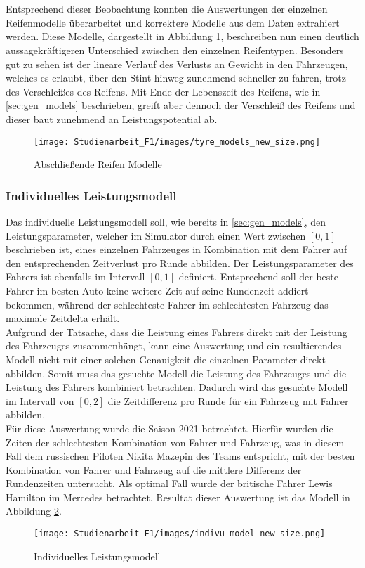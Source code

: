 \\\\
Entsprechend dieser Beobachtung konnten die Auswertungen der einzelnen Reifenmodelle überarbeitet und korrektere Modelle aus dem Daten extrahiert werden. Diese Modelle, dargestellt in Abbildung \ref{fig:tyre_models_new}, beschreiben nun einen deutlich aussagekräftigeren Unterschied zwischen den einzelnen Reifentypen. Besonders gut zu sehen ist der lineare Verlauf des Verlusts an Gewicht in den Fahrzeugen, welches es erlaubt, über den Stint hinweg zunehmend schneller zu fahren, trotz des Verschleißes des Reifens. Mit Ende der Lebenszeit des Reifens, wie in \ref{sec:gen_models} beschrieben, greift aber dennoch der Verschleiß des Reifens und dieser baut zunehmend an Leistungspotential ab.\\
\begin{figure}
    \texttt{[image: Studienarbeit\_F1/images/tyre\_models\_new\_size.png]}
    \caption{Abschließende Reifen Modelle}
    \label{fig:tyre_models_new}
\end{figure}

\subsubsection{Individuelles Leistungsmodell}
Das individuelle Leistungsmodell soll, wie bereits in \ref{sec:gen_models}, den Leistungsparameter, welcher im Simulator durch einen Wert zwischen $[0,1]$ beschrieben ist, eines einzelnen Fahrzeuges in Kombination mit dem Fahrer auf den entsprechenden Zeitverlust pro Runde abbilden. Der Leistungsparameter des Fahrers ist ebenfalls im Intervall $[0,1]$ definiert. Entsprechend soll der beste Fahrer im besten Auto keine weitere Zeit auf seine Rundenzeit addiert bekommen, während der schlechteste Fahrer im schlechtesten Fahrzeug das maximale Zeitdelta erhält.\\
Aufgrund der Tatsache, dass die Leistung eines Fahrers direkt mit der Leistung des Fahrzeuges zusammenhängt, kann eine Auswertung und ein resultierendes Modell nicht mit einer solchen Genauigkeit die einzelnen Parameter direkt abbilden. Somit muss das gesuchte Modell die Leistung des Fahrzeuges und die Leistung des Fahrers kombiniert betrachten. Dadurch wird das gesuchte Modell im Intervall von $[0,2]$ die Zeitdifferenz pro Runde für ein Fahrzeug mit Fahrer abbilden.\\
Für diese Auswertung wurde die Saison 2021 betrachtet. Hierfür wurden die Zeiten der schlechtesten Kombination von Fahrer und Fahrzeug, was in diesem Fall dem russischen Piloten Nikita Mazepin des Teams  entspricht, mit der besten Kombination von Fahrer und Fahrzeug auf die mittlere Differenz der Rundenzeiten untersucht. Als optimal Fall wurde der britische Fahrer Lewis Hamilton im Mercedes betrachtet. Resultat dieser Auswertung ist das Modell in Abbildung \ref{fig:individual_model}.
\begin{figure}
    \texttt{[image: Studienarbeit\_F1/images/indivu\_model\_new\_size.png]}
    \caption{Individuelles Leistungsmodell}
    \label{fig:individual_model}
\end{figure}

